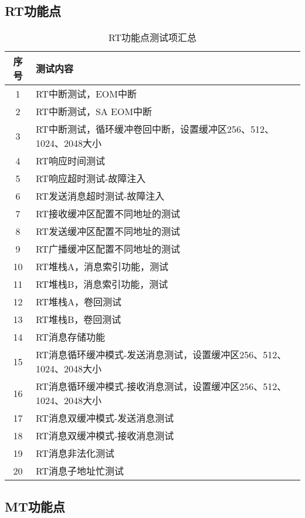 \documentclass[fontset=windows]{article}
\begin{document}
\subsection{RT功能点}

\begin{table}[H] %
    \centering
    \begin{tabular}{|c|p{10cm}|}
        \hline
        序号 & 测试内容 \\
        \hline
        1  & RT中断测试，EOM中断 \\
        2  & RT中断测试，SA EOM中断 \\
        3  & RT中断测试，循环缓冲卷回中断，设置缓冲区256、512、1024、2048大小 \\
        4  & RT响应时间测试 \\
        5  & RT响应超时测试-故障注入 \\
        6  & RT发送消息超时测试-故障注入 \\
        7  & RT接收缓冲区配置不同地址的测试 \\
        8  & RT发送缓冲区配置不同地址的测试 \\
        9  & RT广播缓冲区配置不同地址的测试 \\
        10 & RT堆栈A，消息索引功能，测试 \\
        11 & RT堆栈B，消息索引功能，测试 \\
        12 & RT堆栈A，卷回测试 \\
        13 & RT堆栈B，卷回测试 \\
        14 & RT消息存储功能 \\
        15 & RT消息循环缓冲模式-发送消息测试，设置缓冲区256、512、1024、2048大小 \\
        16 & RT消息循环缓冲模式-接收消息测试，设置缓冲区256、512、1024、2048大小 \\
        17 & RT消息双缓冲模式-发送消息测试 \\
        18 & RT消息双缓冲模式-接收消息测试 \\
        19 & RT消息非法化测试 \\
        20 & RT消息子地址忙测试 \\
        \hline
    \end{tabular}
    \caption{RT功能点测试项汇总}
    \label{tab:rt-feature-summary}
\end{table}


\subsection{MT功能点}
\end{document}
